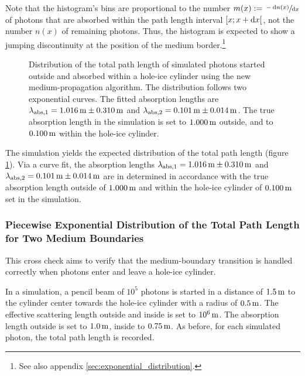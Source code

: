 Note that the histogram's bins are proportional to the number
\(m(x):=\sfrac{-\text{d} n(x)}{\text{d} x}\) of photons that are absorbed within the
path length interval \([x; x+\text{d} x[\), not the number \(n(x)\) of
remaining photons. Thus, the histogram is expected to show a jumping
discontinuity at the position of the medium
border.\footnote{See also appendix \ref{sec:exponential_distribution}.}

\begin{figure}[htbp]
  \caption{Distribution of the total path length of simulated photons started outside and absorbed within a hole-ice cylinder using the new medium-propagation algorithm. The distribution follows two exponential curves. The fitted absorption lengths are $\lambda_\text{abs,1} = 1.016\text{\,m} \pm 0.310\text{\,m}$ and $\lambda_\text{abs,2} = 0.101\text{\,m} \pm 0.014\text{\,m}$. The true absorption length in the simulation is set to $1.000\text{\,m}$ outside, and to $0.100\text{\,m}$ within the hole-ice cylinder.}
  \label{fig:iquo3Ou3}
\end{figure}

The simulation yields the expected distribution of the total path length
(figure \ref{fig:iquo3Ou3}). Via a curve fit, the absorption lengths
\(\lambda_\text{abs,1} = 1.016\text{\,m} \pm 0.310\text{\,m}\) and
\(\lambda_\text{abs,2} = 0.101\text{\,m} \pm 0.014\text{\,m}\) are in determined in
accordance with the true absorption length outside of \(1.000\text{\,m}\) and
within the hole-ice cylinder of \(0.100\text{\,m}\) set in the simulation.

\FloatBarrier\newpage
\subsubsection{Piecewise Exponential Distribution of the Total Path Length for Two Medium Boundaries}

This cross check aims to verify that the medium-boundary transition is
handled correctly when photons enter and leave a hole-ice cylinder.

In a simulation, a pencil beam of \(10^5\) photons is started in a
distance of \(1.5\text{\,m}\) to the cylinder center towards the hole-ice
cylinder with a radius of \(0.5\text{\,m}\). The effective scattering length
outside and inside is set to \(10^6\text{\,m}\). The absorption length outside
is set to \(1.0\text{\,m}\), inside to \(0.75\text{\,m}\). As before, for each simulated
photon, the total path length is recorded.


